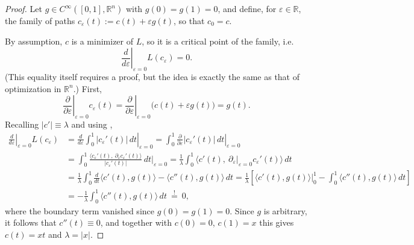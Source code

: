 \begin{proof}
Let $g \in C^\infty([0,1],\mathbb{R}^n)$ with $g(0)=g(1)=0$, and define, for $\varepsilon \in
\mathbb{R}$, the family of paths $c_\varepsilon(t) := c(t) + \varepsilon g(t)$, so that
$c_0 = c$.

\begin{center}
\end{center}

By assumption, $c$ is a minimizer of $L$, so it is a critical point of the family, i.e.
\[\left.\frac{d}{d\varepsilon}\right|_{\varepsilon=0} L(c_\varepsilon) = 0.\]
(This equality itself requires a proof, but the idea is exactly the same as that of
optimization in $\mathbb{R}^n$.) First,
\[\left.\frac{\partial}{\partial\varepsilon}\right|_{\varepsilon=0} c_\varepsilon(t)
  = \left.\frac{\partial}{\partial\varepsilon}\right|_{\varepsilon=0}
    \big(c(t)+\varepsilon g(t)\big) = g(t).\]
Recalling $\lvert c'\rvert \equiv \lambda$ and using
,
\[
\begin{aligned}
\left.\frac{d}{d\varepsilon}\right|_{\varepsilon=0} L(c_\varepsilon)
  &= \left.\frac{d}{d\varepsilon}\int_0^1 \lvert c_\varepsilon'(t)\rvert\,dt\right|_{\varepsilon=0}
   = \int_0^1 \left.\frac{\partial}{\partial\varepsilon}\lvert c_\varepsilon'(t)\rvert\,dt
     \right|_{\varepsilon=0} \\
  &= \int_0^1 \frac{\big\langle c_\varepsilon'(t),\ \partial_\varepsilon c_\varepsilon'(t)
       \big\rangle}{\lvert c_\varepsilon'(t)\rvert}\,dt\bigg|_{\varepsilon=0}
   = \frac1\lambda \int_0^1 \Big\langle c'(t),\ \partial_\varepsilon\big|_{\varepsilon=0}
       c_\varepsilon'(t)\Big\rangle\,dt \\
  &= \frac1\lambda \int_0^1 \frac{d}{dt}\Big\langle c'(t), g(t)\Big\rangle
       - \big\langle c''(t), g(t)\big\rangle\,dt
   = \frac1\lambda\left[\big\langle c'(t),g(t)\big\rangle\Big|_0^1
       - \int_0^1 \big\langle c''(t),g(t)\big\rangle\,dt\right] \\
  &= -\frac1\lambda \int_0^1 \big\langle c''(t),g(t)\big\rangle\,dt \ \overset{!}{=}\ 0,
\end{aligned}
\]
where the boundary term vanished since $g(0)=g(1)=0$. Since $g$ is arbitrary, it follows that
$c''(t) \equiv 0$, and together with $c(0)=0$, $c(1)=x$ this gives $c(t)=xt$ and $\lambda =
\lvert x\rvert$.
\end{proof}


